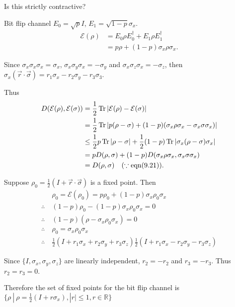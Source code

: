Is this strictly contractive?


Bit flip channel $E_0 = \sqrt{p} I$,  $E_1 = \sqrt{1-p}\sigma_x$.
\begin{align*}
	\mathcal{E}(\rho) &= E_0 \rho E_0^\dagger + E_1 \rho E_1^\dagger\\
		&= p \rho + (1-p) \sigma_x \rho \sigma_x.
\end{align*}

Since $\sigma_x \sigma_x \sigma_x = \sigma_x$, $\sigma_x \sigma_y \sigma_x = -\sigma_y$ and $\sigma_x \sigma_z \sigma_x = -\sigma_z$, then $\sigma_x (\vec{r} \cdot \vec{\sigma}) = r_1 \sigma_x - r_2 \sigma_y - r_3 \sigma_3$.

Thus
\begin{align*}
	D(\mathcal{E}(\rho), \mathcal{E}(\sigma)) &= \frac{1}{2} \operatorname{Tr} |\mathcal{E}(\rho) -  \mathcal{E}(\sigma)|\\
		&= \frac{1}{2} \operatorname{Tr} |p(\rho - \sigma) + (1-p) (\sigma_x \rho \sigma_x - \sigma_x \sigma \sigma_x) |\\
		&\leq \frac{1}{2}p \operatorname{Tr} |\rho - \sigma | + \frac{1}{2} (1-p) \operatorname{Tr} |\sigma_x (\rho - \sigma) \sigma_x|\\
		&= pD(\rho, \sigma) +  (1-p) D(\sigma_x \rho \sigma_x, \sigma_x \sigma \sigma_x)\\
		&= D(\rho, \sigma)~~~(\because \text{eqn}(9.21)).
\end{align*}


Suppose $\rho_0 = \frac{1}{2}(I + \vec{r}\cdot \vec{\sigma})$ is a fixed point. Then
\begin{align*}
	&\rho_0 = \mathcal{E}(\rho_0) =p \rho_0 + (1-p) \sigma_x \rho_0 \sigma_x\\
	\therefore~ &(1-p) \rho_0 - (1-p) \sigma_x \rho_0 \sigma_x = 0\\
	\therefore~ &(1-p) (\rho - \sigma_x \rho_0 \sigma_x) = 0\\
	\therefore~ &\rho_0 = \sigma_x \rho_0 \sigma_x\\
	\therefore~ &\frac{1}{2} (I + r_1 \sigma_x + r_2 \sigma_y + r_3 \sigma_z)  \frac{1}{2} (I + r_1 \sigma_x - r_2 \sigma_y - r_3 \sigma_z)
\end{align*}

Since $\{I, \sigma_x, \sigma_y, \sigma_z \}$ are linearly independent, $r_2 = -r_2$ and $r_3 = - r_3$. Thus $r_2 = r_3 = 0$.

Therefore the set of fixed points for the bit flip channel is $\{\rho~ |~ \rho = \frac{1}{2}(I + r \sigma_x), |r| \leq 1, r \in \mathds{R} \}$



